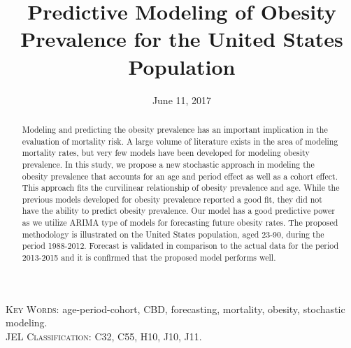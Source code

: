 \documentclass[11pt,letterpaper]{article}
\numberwithin{equation}{section}
\begin{document}
\title{\bf Predictive Modeling of Obesity Prevalence for the United States Population}
\date{June 11, 2017}
\maketitle

\doublespacing

\begin{abstract}
Modeling and predicting the obesity prevalence has an important implication in the evaluation of mortality risk. A large volume of literature exists in the area of modeling mortality rates, but very few models have been developed for modeling obesity prevalence. In this study, we propose a new stochastic approach in modeling the obesity prevalence that accounts for an age and period effect as well as a cohort effect. This approach fits the curvilinear relationship of obesity prevalence and age. While the previous models developed for obesity prevalence reported a good fit, they did not have the ability to predict obesity prevalence. Our model has a good predictive power as we utilize ARIMA type of models for forecasting future obesity rates. The proposed methodology is illustrated on the United States population, aged 23-90, during the period 1988-2012. Forecast is validated in comparison to  the actual data for the period 2013-2015 and it is confirmed that the proposed model performs well.
\end{abstract}
\textsc{Key Words:} age-period-cohort, CBD, forecasting, mortality, obesity, stochastic modeling.\\
\textsc{JEL Classification:} C32, C55, H10, J10, J11. \\
\end{document}
